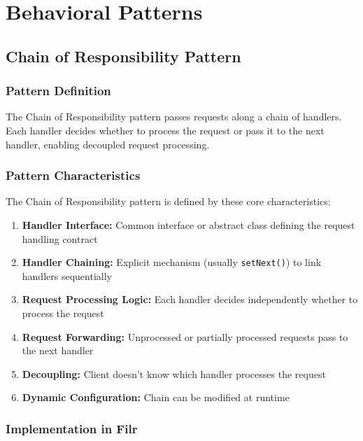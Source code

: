 \documentclass[11pt]{article}
\begin{document}
\section{Behavioral Patterns}

\subsection{Chain of Responsibility Pattern}

\subsubsection{Pattern Definition}
The Chain of Responsibility pattern passes requests along a chain of handlers. Each handler decides whether to process the request or pass it to the next handler, enabling decoupled request processing.

\subsubsection{Pattern Characteristics}
The Chain of Responsibility pattern is defined by these core characteristics:

\begin{enumerate}[noitemsep]
    \item \textbf{Handler Interface:} Common interface or abstract class defining the request handling contract
    \item \textbf{Handler Chaining:} Explicit mechanism (usually \texttt{setNext()}) to link handlers sequentially
    \item \textbf{Request Processing Logic:} Each handler decides independently whether to process the request
    \item \textbf{Request Forwarding:} Unprocessed or partially processed requests pass to the next handler
    \item \textbf{Decoupling:} Client doesn't know which handler processes the request
    \item \textbf{Dynamic Configuration:} Chain can be modified at runtime
\end{enumerate}

\subsubsection{Implementation in Filr}
\end{document}
